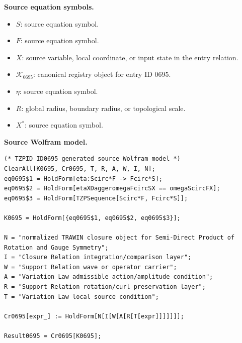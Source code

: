 \begin{minipage}[t]{0.49\linewidth}
\begingroup
\small
\raggedright
\textbf{Source equation symbols.}\par
\begin{itemize}[leftmargin=1.35em,itemsep=1pt,topsep=1pt,parsep=0pt]
    \item $S$: source equation symbol.
    \item $F$: source equation symbol.
    \item $X$: source variable, local coordinate, or input state in the entry relation.
    \item $\mathcal{K}_{0695}$: canonical registry object for entry ID 0695.
    \item $\eta$: source equation symbol.
    \item $R$: global radius, boundary radius, or topological scale.
    \item $X^{*}$: source equation symbol.
\end{itemize}
\endgroup
\end{minipage}\hfill
\begin{minipage}[t]{0.47\linewidth}
\begingroup
\scriptsize
\raggedright
\textbf{Source Wolfram model.}\par
\begin{Verbatim}[fontsize=\tiny,breaklines=true,breakanywhere=true]
(* TZPID ID0695 generated source Wolfram model *)
ClearAll[K0695, Cr0695, T, R, A, W, I, N];
eq0695$1 = HoldForm[eta:Scirc*F -> Fcirc*S];
eq0695$2 = HoldForm[etaXDaggeromegaFcircSX == omegaScircFX];
eq0695$3 = HoldForm[TZPSequence[Scirc*F, Fcirc*S]];

K0695 = HoldForm[{eq0695$1, eq0695$2, eq0695$3}];

N = "normalized TRAWIN closure object for Semi-Direct Product of Rotation and Gauge Symmetry";
I = "Closure Relation integration/comparison layer";
W = "Support Relation wave or operator carrier";
A = "Variation Law admissible action/amplitude condition";
R = "Support Relation rotation/curl preservation layer";
T = "Variation Law local source condition";

Cr0695[expr_] := HoldForm[N[I[W[A[R[T[expr]]]]]]];

Result0695 = Cr0695[K0695];
\end{Verbatim}
\endgroup
\end{minipage}

